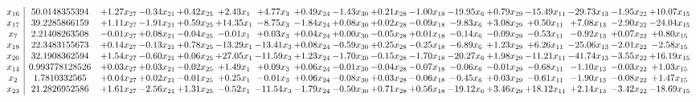 \documentclass[9pt]{article}
\begin{document}
 \[\begin{array}{c| c c@{\hskip 2pt} c@{\hskip 2pt} c@{\hskip 2pt} c@{\hskip 2pt} c@{\hskip 2pt} c@{\hskip 2pt} c@{\hskip 2pt} c@{\hskip 2pt} c@{\hskip 2pt} c@{\hskip 2pt} c@{\hskip 2pt} c@{\hskip 2pt} c@{\hskip 2pt} c@{\hskip 2pt} c@{\hskip 2pt} }
 x_{16}   &  50.0148355394 & +  1.27 x_{27} & -0.34 x_{21} & +  0.42 x_{25} & +  2.43 x_{1} & +  4.77 x_{3} & +  0.49 x_{24} & -1.43 x_{30} & +  0.21 x_{28} & -1.00 x_{18} & -19.95 x_{6} & +  0.79 x_{29} & -15.49 x_{11} & -29.73 x_{13} & -1.95 x_{22} & + 10.07 x_{15}\\
 x_{17}   &  39.2285866159 & +  1.11 x_{27} & -1.91 x_{21} & +  0.59 x_{25} & + 14.35 x_{1} & -8.75 x_{3} & -1.84 x_{24} & +  0.08 x_{30} & +  0.02 x_{28} & -0.09 x_{18} & -9.83 x_{6} & +  3.08 x_{29} & +  0.50 x_{11} & +  7.08 x_{13} & -2.90 x_{22} & -24.04 x_{15}\\
 x_{7}   &  2.21408263508 & -0.01 x_{27} & +  0.08 x_{21} & -0.04 x_{25} & -0.01 x_{1} & +  0.03 x_{3} & +  0.04 x_{24} & +  0.00 x_{30} & -0.05 x_{28} & +  0.01 x_{18} & -0.14 x_{6} & -0.09 x_{29} & -0.53 x_{11} & -0.92 x_{13} & +  0.07 x_{22} & +  0.80 x_{15}\\
 x_{19}   &  22.3483155673 & +  0.14 x_{27} & -0.13 x_{21} & +  0.78 x_{25} & -13.29 x_{1} & -13.41 x_{3} & +  0.08 x_{24} & -0.59 x_{30} & +  0.25 x_{28} & -0.25 x_{18} & -6.89 x_{6} & +  1.23 x_{29} & +  6.26 x_{11} & -25.06 x_{13} & -2.01 x_{22} & -2.58 x_{15}\\
 x_{20}   &  32.1908362594 & +  1.54 x_{27} & -0.60 x_{21} & +  0.06 x_{25} & + 27.05 x_{1} & -11.59 x_{3} & +  1.23 x_{24} & -1.70 x_{30} & -0.15 x_{28} & -1.70 x_{18} & -20.27 x_{6} & +  1.98 x_{29} & -11.21 x_{11} & -41.74 x_{13} & -3.55 x_{22} & + 16.19 x_{15}\\
 x_{14}   &  0.993778128526 & +  0.03 x_{27} & +  0.03 x_{21} & -0.02 x_{25} & +  1.49 x_{1} & +  0.09 x_{3} & +  0.06 x_{24} & -0.01 x_{30} & -0.04 x_{28} & -0.07 x_{18} & -0.06 x_{6} & -0.01 x_{29} & -0.68 x_{11} & -1.10 x_{13} & -0.03 x_{22} & +  1.03 x_{15}\\
 x_{2}   &  1.7810332565 & +  0.04 x_{27} & +  0.02 x_{21} & -0.01 x_{25} & +  0.25 x_{1} & -0.01 x_{3} & +  0.06 x_{24} & -0.08 x_{30} & +  0.03 x_{28} & -0.06 x_{18} & -0.45 x_{6} & +  0.03 x_{29} & -0.61 x_{11} & -1.90 x_{13} & -0.08 x_{22} & +  1.47 x_{15}\\
 x_{23}   &  21.2826952586 & +  1.61 x_{27} & -2.56 x_{21} & +  1.31 x_{25} & -0.52 x_{1} & -11.54 x_{3} & -1.79 x_{24} & -0.50 x_{30} & +  0.71 x_{28} & +  0.56 x_{18} & -19.12 x_{6} & +  3.46 x_{29} & + 18.12 x_{11} & +  2.14 x_{13} & -3.42 x_{22} & -18.69 x_{15}\\

\end{array}\]
\end{document}
